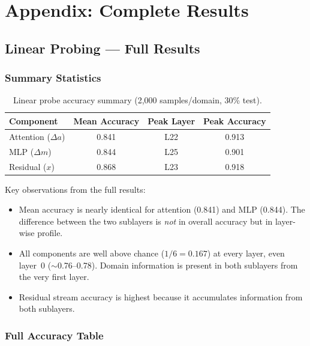 \documentclass[11pt]{article}
\newcommand{\attn}{\Delta a}
\newcommand{\mlp}{\Delta m}
\newcommand{\resid}{x}
\begin{document}
\newpage
\section{Appendix: Complete Results}
\label{app:results}

\subsection{Linear Probing — Full Results}

\subsubsection{Summary Statistics}

\begin{table}[h]
\centering
\begin{tabular}{lccc}
\toprule
Component & Mean Accuracy & Peak Layer & Peak Accuracy \\
\midrule
Attention ($\attn$) & 0.841 & L22 & 0.913 \\
MLP ($\mlp$) & 0.844 & L25 & 0.901 \\
Residual ($\resid$) & 0.868 & L23 & 0.918 \\
\bottomrule
\end{tabular}
\caption{Linear probe accuracy summary (2{,}000 samples/domain, 30\% test).}
\label{tab:probe}
\end{table}

Key observations from the full results:
\begin{itemize}
    \item Mean accuracy is nearly identical for attention (0.841) and MLP (0.844). The difference between the two sublayers is \emph{not} in overall accuracy but in layer-wise profile.
    \item All components are well above chance ($1/6 = 0.167$) at every layer, even layer~0 ($\sim$0.76--0.78). Domain information is present in both sublayers from the very first layer.
    \item Residual stream accuracy is highest because it accumulates information from both sublayers.
\end{itemize}

\subsubsection{Full Accuracy Table}
\end{document}
